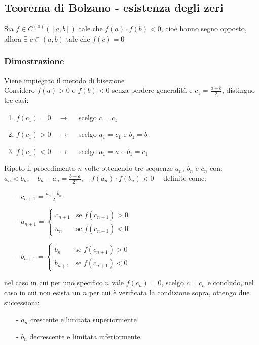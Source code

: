 \documentclass[a4paper]{article}
\newcommand\cont[2]{C^{(#1)} \left({#2}\right)}
\begin{document}
\subsection{Teorema di Bolzano - esistenza degli zeri}
Sia \(f \in \cont{0}{\left[a, b\right]}\) tale che \(f(a) \cdot f(b) < 0\), cioè hanno segno opposto, allora \(\exists \; c \in \left(a, b\right)\)
tale che \(f(c) = 0\)

\subsubsection*{Dimostrazione}
Viene impiegato il metodo di bisezione \\
Considero \(f(a) > 0\) e \(f(b) < 0\) senza perdere generalità e \(\displaystyle c_1 = \frac{a + b}{2}\), distinguo tre casi:
\begin{enumerate} [topsep=3pt, itemsep=0pt]
	\item \(f(c_1) = 0 \quad \rightarrow \quad\) scelgo \(c = c_1\)
	\item \(f(c_1) > 0 \quad \rightarrow \quad\) scelgo \(a_1 = c_1\) e \(b_1 = b\)
	\item \(f(c_1) < 0 \quad \rightarrow \quad\) scelgo \(a_1 = a\) e \(b_1 = c_1\)
\end{enumerate}
Ripeto il procedimento \(n\) volte ottenendo tre sequenze \(a_n\), \(b_n\) e \(c_n\) con: \\
\(\displaystyle a_n < b_n, \quad b_n - a_n = \frac{b-a}{2^n}, \quad f(a_n) \cdot f(b_n) < 0 \quad\) definite come:
\begin{itemize} [topsep=3pt, itemsep=0pt]
	\item[-] \(\displaystyle c_{n+1} = \frac{a_n + b_n}{2}\)
	\item[-] \(a_{n+1} = \begin{cases}
		c_{n+1} &\text{se } f(c_{n+1}) > 0 \\
		a_n & \text{se } f(c_{n+1}) < 0
	\end{cases}\)
	\item[-] \(b_{n+1} = \begin{cases}
		b_n &\text{se } f(c_{n+1}) > 0 \\
		b_{n+1} & \text{se } f(c_{n+1}) < 0
	\end{cases}\)
\end{itemize}
nel caso in cui per uno specifico \(n\) vale \(f(c_n) = 0\), scelgo \(c = c_n\) e concludo, nel caso in cui non esista un \(n\)
per cui è verificata la condizione sopra, ottengo due successioni:
\begin{itemize} [topsep=3pt, itemsep=0pt]
	\item[-] \(a_n\) crescente e limitata superiormente
	\item[-] \(b_n\) decrescente e limitata inferiormente
\end{itemize}
\end{document}
